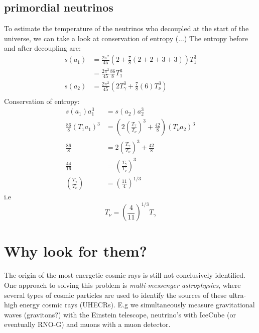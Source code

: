 \documentclass[11pt,a4paper,faculty=we,language=en,doctype=report]{cls/ugent-doc}
\begin{document}
\subsection{primordial neutrinos}
To estimate the temperature of the neutrinos who decoupled at the start of the universe, we can take a look at conservation of entropy \cite{Dodelson}
(...)
The entropy before and after decoupling are:
\begin{align}
	s(a_1) &= \frac{2\pi^2}{45}(2 + \frac{7}{8}(2+2+3+3))T_1^3\\
	&= \frac{2\pi^2}{45}\frac{86}{8}T_1^3\\
	s(a_2) &= \frac{2\pi^2}{45}(2T_\gamma^3 + \frac{7}{8}(6)T_\nu^3)\\
\end{align}
Conservation of entropy:
\begin{align}
	s(a_1)a_1^3 &= s(a_2)a_2^3\\
	\frac{86}{8}(T_1 a_1)^3 &= \left(2\left(\frac{T_\gamma}{T_\nu}\right)^3 + \frac{42}{8}\right)(T_\nu a_2)^3\\
	\frac{86}{8} &= 2\left(\frac{T_\gamma}{T_\nu}\right)^3 + \frac{42}{8}\\
	\frac{44}{16} &= \left(\frac{T_\gamma}{T_\nu}\right)^3\\
	\left(\frac{T_\gamma}{T_\nu}\right) &= \left(\frac{11}{4}\right)^{1/3}
\end{align}
i.e
\begin{equation}
	T_\nu = \left(\frac{4}{11}\right)^{1/3}T_\gamma
\end{equation}
\section{Why look for them?}
The origin of the most energetic cosmic rays is still not conclusively identified. One approach to solving this problem is \textit{multi-messenger astrophysics}, where several types of cosmic particles are used to identify the sources of these ultra-high energy cosmic rays (UHECRs). E.g we simultaneously measure gravitational waves (gravitons?) with the Einstein telescope, neutrino's with IceCube (or eventually RNO-G) and muons with a muon detector.
\newpage
\end{document}
